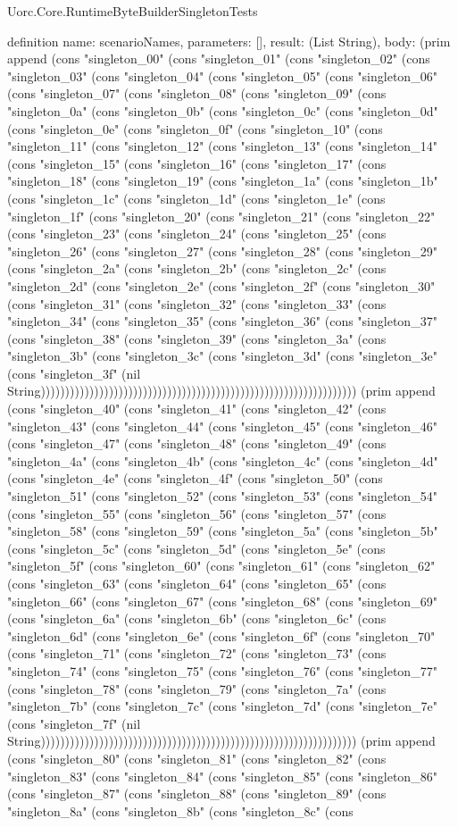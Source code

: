 \begin{lexlean}{Uorc.Core.RuntimeByteBuilderSingletonTests}
\begin{semanticmodule}
definition{
  name: scenarioNames,
  parameters: [],
  result: (List String),
  body: (prim append (cons "singleton_00" (cons "singleton_01" (cons "singleton_02" (cons "singleton_03" (cons "singleton_04" (cons "singleton_05" (cons "singleton_06" (cons "singleton_07" (cons "singleton_08" (cons "singleton_09" (cons "singleton_0a" (cons "singleton_0b" (cons "singleton_0c" (cons "singleton_0d" (cons "singleton_0e" (cons "singleton_0f" (cons "singleton_10" (cons "singleton_11" (cons "singleton_12" (cons "singleton_13" (cons "singleton_14" (cons "singleton_15" (cons "singleton_16" (cons "singleton_17" (cons "singleton_18" (cons "singleton_19" (cons "singleton_1a" (cons "singleton_1b" (cons "singleton_1c" (cons "singleton_1d" (cons "singleton_1e" (cons "singleton_1f" (cons "singleton_20" (cons "singleton_21" (cons "singleton_22" (cons "singleton_23" (cons "singleton_24" (cons "singleton_25" (cons "singleton_26" (cons "singleton_27" (cons "singleton_28" (cons "singleton_29" (cons "singleton_2a" (cons "singleton_2b" (cons "singleton_2c" (cons "singleton_2d" (cons "singleton_2e" (cons "singleton_2f" (cons "singleton_30" (cons "singleton_31" (cons "singleton_32" (cons "singleton_33" (cons "singleton_34" (cons "singleton_35" (cons "singleton_36" (cons "singleton_37" (cons "singleton_38" (cons "singleton_39" (cons "singleton_3a" (cons "singleton_3b" (cons "singleton_3c" (cons "singleton_3d" (cons "singleton_3e" (cons "singleton_3f" (nil String))))))))))))))))))))))))))))))))))))))))))))))))))))))))))))))))) (prim append (cons "singleton_40" (cons "singleton_41" (cons "singleton_42" (cons "singleton_43" (cons "singleton_44" (cons "singleton_45" (cons "singleton_46" (cons "singleton_47" (cons "singleton_48" (cons "singleton_49" (cons "singleton_4a" (cons "singleton_4b" (cons "singleton_4c" (cons "singleton_4d" (cons "singleton_4e" (cons "singleton_4f" (cons "singleton_50" (cons "singleton_51" (cons "singleton_52" (cons "singleton_53" (cons "singleton_54" (cons "singleton_55" (cons "singleton_56" (cons "singleton_57" (cons "singleton_58" (cons "singleton_59" (cons "singleton_5a" (cons "singleton_5b" (cons "singleton_5c" (cons "singleton_5d" (cons "singleton_5e" (cons "singleton_5f" (cons "singleton_60" (cons "singleton_61" (cons "singleton_62" (cons "singleton_63" (cons "singleton_64" (cons "singleton_65" (cons "singleton_66" (cons "singleton_67" (cons "singleton_68" (cons "singleton_69" (cons "singleton_6a" (cons "singleton_6b" (cons "singleton_6c" (cons "singleton_6d" (cons "singleton_6e" (cons "singleton_6f" (cons "singleton_70" (cons "singleton_71" (cons "singleton_72" (cons "singleton_73" (cons "singleton_74" (cons "singleton_75" (cons "singleton_76" (cons "singleton_77" (cons "singleton_78" (cons "singleton_79" (cons "singleton_7a" (cons "singleton_7b" (cons "singleton_7c" (cons "singleton_7d" (cons "singleton_7e" (cons "singleton_7f" (nil String))))))))))))))))))))))))))))))))))))))))))))))))))))))))))))))))) (prim append (cons "singleton_80" (cons "singleton_81" (cons "singleton_82" (cons "singleton_83" (cons "singleton_84" (cons "singleton_85" (cons "singleton_86" (cons "singleton_87" (cons "singleton_88" (cons "singleton_89" (cons "singleton_8a" (cons "singleton_8b" (cons "singleton_8c" (cons }
\end{semanticmodule}
\end{lexlean}
